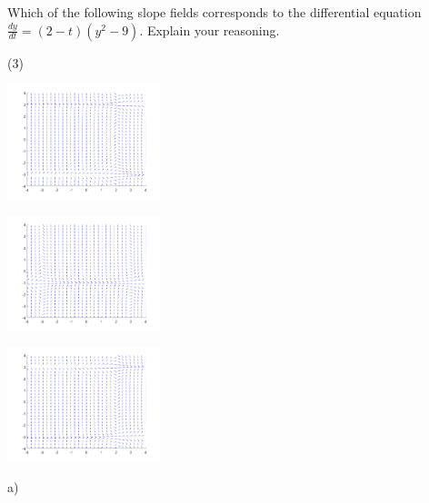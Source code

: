 \begin{exercise}
Which of the following slope fields corresponds to the differential equation $\frac{dy}{dt} = (2-t)(y^2 - 9)$. Explain your reasoning.
\begin{tasks}(3)
\task
\parbox[c]{1.75in}{\includegraphics[width=1.75in]{Images/yprimetm2ysqm9slope}}
\task
\parbox[c]{1.75in}{\includegraphics[width=1.75in]{Images/yprimeyp1tsqm9slope}}
\task
\parbox[c]{1.75in}{\includegraphics[width=1.75in]{Images/yprime2mtysqm9slope}}
\end{tasks}
\end{exercise}
\comboSol{%
}
{%
a)
}


\newpage

